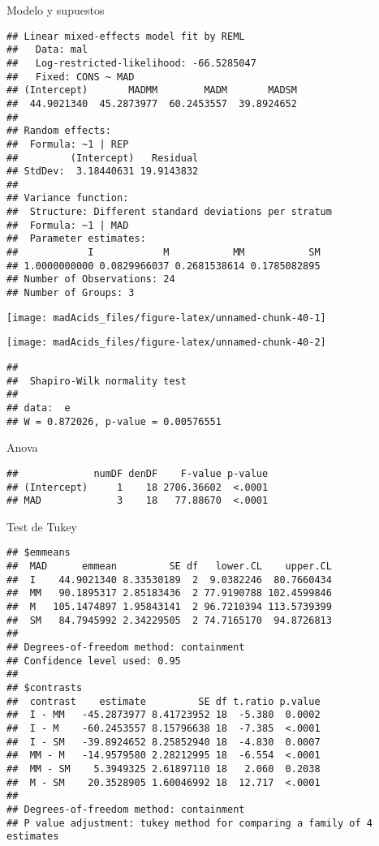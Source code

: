 \documentclass[
]{article}
\begin{document}
Modelo y supuestos

\begin{verbatim}
## Linear mixed-effects model fit by REML
##   Data: mal 
##   Log-restricted-likelihood: -66.5285047
##   Fixed: CONS ~ MAD 
## (Intercept)       MADMM        MADM       MADSM 
##  44.9021340  45.2873977  60.2453557  39.8924652 
## 
## Random effects:
##  Formula: ~1 | REP
##         (Intercept)   Residual
## StdDev:  3.18440631 19.9143832
## 
## Variance function:
##  Structure: Different standard deviations per stratum
##  Formula: ~1 | MAD 
##  Parameter estimates:
##            I            M           MM           SM 
## 1.0000000000 0.0829966037 0.2681538614 0.1785082895 
## Number of Observations: 24
## Number of Groups: 3
\end{verbatim}

\begin{center}\texttt{[image: madAcids\_files/figure-latex/unnamed-chunk-40-1]} \end{center}

\begin{center}\texttt{[image: madAcids\_files/figure-latex/unnamed-chunk-40-2]} \end{center}

\begin{verbatim}
## 
##  Shapiro-Wilk normality test
## 
## data:  e
## W = 0.872026, p-value = 0.00576551
\end{verbatim}

Anova

\begin{verbatim}
##             numDF denDF    F-value p-value
## (Intercept)     1    18 2706.36602  <.0001
## MAD             3    18   77.88670  <.0001
\end{verbatim}

Test de Tukey

\begin{verbatim}
## $emmeans
##  MAD      emmean         SE df   lower.CL    upper.CL
##  I    44.9021340 8.33530189  2  9.0382246  80.7660434
##  MM   90.1895317 2.85183436  2 77.9190788 102.4599846
##  M   105.1474897 1.95843141  2 96.7210394 113.5739399
##  SM   84.7945992 2.34229505  2 74.7165170  94.8726813
## 
## Degrees-of-freedom method: containment 
## Confidence level used: 0.95 
## 
## $contrasts
##  contrast    estimate         SE df t.ratio p.value
##  I - MM   -45.2873977 8.41723952 18  -5.380  0.0002
##  I - M    -60.2453557 8.15796638 18  -7.385  <.0001
##  I - SM   -39.8924652 8.25852940 18  -4.830  0.0007
##  MM - M   -14.9579580 2.28212995 18  -6.554  <.0001
##  MM - SM    5.3949325 2.61897110 18   2.060  0.2038
##  M - SM    20.3528905 1.60046992 18  12.717  <.0001
## 
## Degrees-of-freedom method: containment 
## P value adjustment: tukey method for comparing a family of 4 estimates
\end{verbatim}
\end{document}
